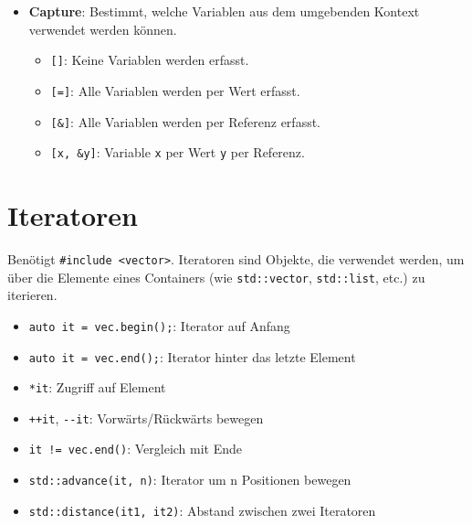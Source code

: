 \documentclass[9pt, landscape]{article}
\begin{document}
\begin{multicols*}{4}
\begin{itemize}
    \item \textbf{Capture}: Bestimmt, welche Variablen aus dem umgebenden Kontext verwendet werden können.
    \begin{itemize}
        \item \lstinline|[]|: Keine Variablen werden erfasst.
        \item \lstinline|[=]|: Alle Variablen werden per Wert erfasst.
        \item \lstinline|[&]|: Alle Variablen werden per Referenz erfasst.
        \item \lstinline|[x, &y]|: Variable \lstinline|x| per Wert \lstinline|y| per Referenz.
    \end{itemize}
\end{itemize}

\section{Iteratoren}
Benötigt \lstinline|#include <vector>|. 
Iteratoren sind Objekte, die verwendet werden, um über die Elemente eines Containers (wie \lstinline|std::vector|, \lstinline|std::list|, etc.) zu iterieren. 
\begin{itemize}
    \item \lstinline|auto it = vec.begin();|: Iterator auf Anfang
    \item \lstinline|auto it = vec.end();|: Iterator hinter das letzte Element
    \item \lstinline|*it|: Zugriff auf Element
    \item \lstinline|++it|, \lstinline|--it|: Vorwärts/Rückwärts bewegen
    \item \lstinline|it != vec.end()|: Vergleich mit Ende
    \item \lstinline|std::advance(it, n)|: Iterator um n Positionen bewegen
    \item \lstinline|std::distance(it1, it2)|: Abstand zwischen zwei Iteratoren
\end{itemize}



\end{multicols*}
\end{document}
